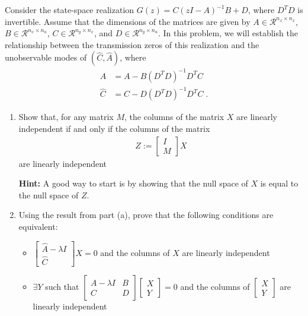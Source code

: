 \item
Consider the state-space realization $G(z)= C(zI-A)^{-1}B + D$, where $D^T D$ is invertible. Assume that the dimensions of the matrices are given by $A \in \mathcal{R}^{n_x \times n_x}$, $B \in \mathcal{R}^{n_x \times n_u}$, $C \in \mathcal{R}^{n_y \times n_x}$, and $D \in \mathcal{R}^{n_y \times n_u}$. In this problem, we will establish the relationship between the transmission zeros of this realization and the unobservable modes of $(\hat{C},\hat{A})$, where
\begin{align*}
    \hat{A} & = A - B (D^T D)^{-1} D^T C \\
    \hat{C} & = C - D (D^T D)^{-1} D^T C \; .
\end{align*}

\begin{enumerate}

\item
Show that, for any matrix $M$, the columns of the matrix $X$ are linearly independent if and only if the columns of the matrix
\begin{align*}
    Z := \begin{bmatrix}
            I \\
            M
        \end{bmatrix} X
\end{align*}
are linearly independent

\textbf{Hint:} A good way to start is by showing that the null space of $X$ is equal to the null space of $Z$.



\item
Using the result from part (a), prove that the following conditions are equivalent:
\begin{itemize}
    \item
    $\begin{bmatrix} \hat{A} - \lambda I \\ \hat{C} \end{bmatrix} X = 0$ and the columns of $X$ are linearly independent

    \item
    $\exists Y$ such that $\begin{bmatrix} A - \lambda I & B \\ C & D \end{bmatrix} \begin{bmatrix} X \\ Y \end{bmatrix} = 0$ and the columns of $\begin{bmatrix} X \\ Y \end{bmatrix}$ are linearly independent


\end{itemize}
\end{enumerate}
